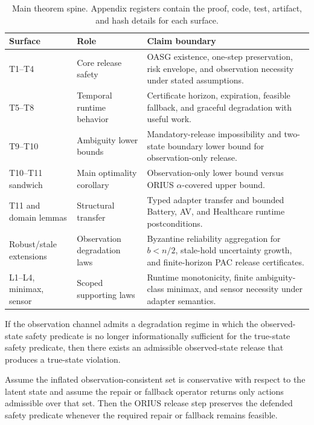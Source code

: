 \begin{table}[htbp]
\centering
\footnotesize
\caption{Main theorem spine. Appendix registers contain the proof, code, test, artifact, and hash details for each surface.}
\label{tab:promotion-gated-theorem-package}
\begin{tabularx}{\textwidth}{llX}
\toprule
\textbf{Surface} & \textbf{Role} & \textbf{Claim boundary}\\
\midrule
T1--T4 & Core release safety & OASG existence, one-step preservation, risk envelope, and observation necessity under stated assumptions.\\
T5--T8 & Temporal runtime behavior & Certificate horizon, expiration, feasible fallback, and graceful degradation with useful work.\\
T9--T10 & Ambiguity lower bounds & Mandatory-release impossibility and two-state boundary lower bound for observation-only release.\\
T10--T11 sandwich & Main optimality corollary & Observation-only lower bound versus ORIUS $\alpha$-covered upper bound.\\
T11 and domain lemmas & Structural transfer & Typed adapter transfer and bounded Battery, AV, and Healthcare runtime postconditions.\\
Robust/stale extensions & Observation degradation laws & Byzantine reliability aggregation for $b<n/2$, stale-hold uncertainty growth, and finite-horizon PAC release certificates.\\
L1--L4, minimax, sensor & Scoped supporting laws & Runtime monotonicity, finite ambiguity-class minimax, and sensor necessity under adapter semantics.\\
\bottomrule
\end{tabularx}
\end{table}

\begin{theorem}
\label{thm:oasg-existence}
If the observation channel admits a degradation regime in which the observed-state safety
predicate is no longer informationally sufficient for the true-state safety predicate, then
there exists an admissible observed-state release that produces a true-state violation.
\end{theorem}

\begin{theorem}
\label{thm:safety-preservation}
Assume the inflated observation-consistent set is conservative with respect to the latent
state and assume the repair or fallback operator returns only actions admissible over that
set. Then the ORIUS release step preserves the defended safety predicate whenever the
required repair or fallback remains feasible.
\end{theorem}

